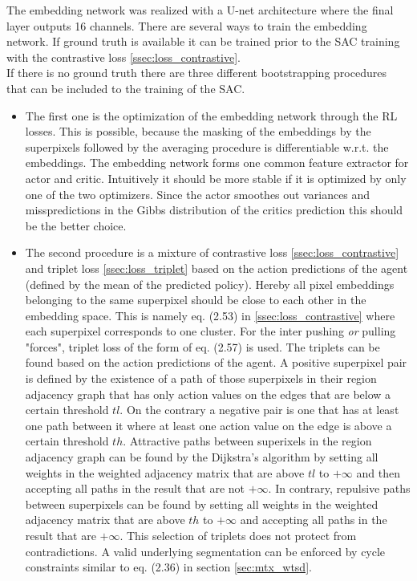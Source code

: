 The embedding network was realized with a U-net architecture where the final layer outputs 16 channels. There are several ways to train the embedding network. If ground truth is available it can be trained prior to the SAC training with the contrastive loss \ref{ssec:loss_contrastive}.\\
If there is no ground truth there are three different bootstrapping procedures that can be included to the training of the SAC.\\
\begin{itemize}
 	\item The first one is the optimization of the embedding network through the RL losses. This is possible, because the masking of the embeddings by the superpixels followed by the averaging procedure is differentiable w.r.t. the embeddings. The embedding network forms one common feature extractor for actor and critic. Intuitively it should be more stable if it is optimized by only one of the two optimizers. Since the actor smoothes out variances and misspredictions in the Gibbs distribution of the critics prediction this should be the better choice.
 	\item The second procedure is a mixture of contrastive loss \ref{ssec:loss_contrastive} and triplet loss \ref{ssec:loss_triplet} based on the action predictions of the agent (defined by the mean of the predicted policy). Hereby all pixel embeddings belonging to the same superpixel should be close to each other in the embedding space. This is namely eq. (2.53) in \ref{ssec:loss_contrastive} where each superpixel corresponds to one cluster. For the inter pushing \emph{or} pulling "forces", triplet loss of the form of eq. (2.57) is used. The triplets can be found based on the action predictions of the agent. A positive superpixel pair is defined by the existence of a path of those superpixels in their region adjacency graph that has only action values on the edges that are below a certain threshold $tl$. On the contrary a negative pair is one that has at least one path between it where at least one action value on the edge is above a certain threshold $th$. Attractive paths between superixels in the region adjacency graph can be found by the Dijkstra's algorithm by setting all weights in the weighted adjacency matrix that are above $tl$ to $+\infty$ and then accepting all paths in the result that are not $+\infty$. In contrary, repulsive paths between superpixels can be found by setting all weights in the weighted adjacency matrix that are above $th$ to $+\infty$ and accepting all paths in the result that are $+\infty$. This selection of triplets does not protect from contradictions. A valid underlying segmentation can be enforced by cycle constraints similar to eq. (2.36) in section \ref{sec:mtx_wtsd}.

\end{itemize}
